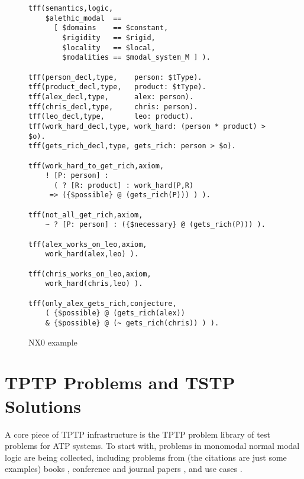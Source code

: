 \documentclass[runningheads]{llncs}
\begin{document}
\begin{figure}[htbp]
\small
{}
\begin{verbatim}
tff(semantics,logic,
    $alethic_modal  ==
      [ $domains    == $constant,
        $rigidity   == $rigid,
        $locality   == $local,
        $modalities == $modal_system_M ] ).

tff(person_decl,type,    person: $tType).
tff(product_decl,type,   product: $tType).
tff(alex_decl,type,      alex: person).
tff(chris_decl,type,     chris: person).
tff(leo_decl,type,       leo: product).
tff(work_hard_decl,type, work_hard: (person * product) > $o).
tff(gets_rich_decl,type, gets_rich: person > $o).

tff(work_hard_to_get_rich,axiom,
    ! [P: person] :
      ( ? [R: product] : work_hard(P,R)
     => ({$possible} @ (gets_rich(P))) ) ).

tff(not_all_get_rich,axiom,
    ~ ? [P: person] : ({$necessary} @ (gets_rich(P))) ).

tff(alex_works_on_leo,axiom,
    work_hard(alex,leo) ).

tff(chris_works_on_leo,axiom,
    work_hard(chris,leo) ).

tff(only_alex_gets_rich,conjecture,
    ( {$possible} @ (gets_rich(alex)) 
    & {$possible} @ (~ gets_rich(chris)) ) ).
\end{verbatim}
\caption{NX0 example}
\label{NX0Example}
\end{figure}

\section{TPTP Problems and TSTP Solutions}
\label{TPTPTSTP}

A core piece of TPTP infrastructure is the TPTP problem library of test problems for ATP systems.
To start with, problems in monomodal normal modal logic are being collected, including problems 
from (the citations are just some examples)
books \cite{For94,FM98,Gir00,Sid10}, 
conference and journal papers \cite{Rei92,FH+98,Sto00,PN+21}, 
and 
use cases \cite{BW14-ECAI,MR22}.
\end{document}
